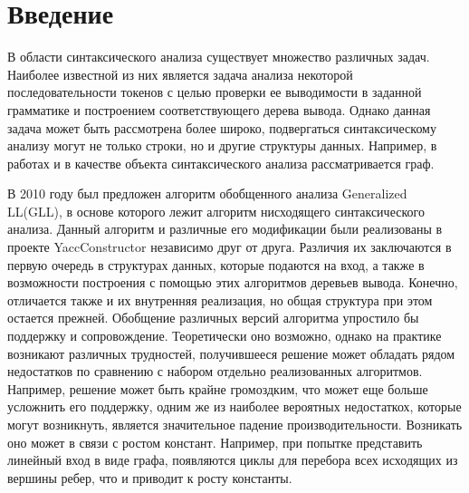 \documentclass[14pt]{matmex-diploma}
\begin{document}
\maketitle
\tableofcontents

\section*{Введение}
В области синтаксического анализа существует множество различных задач. Наиболее известной из них является задача анализа некоторой последовательности токенов с целью проверки ее выводимости в заданной грамматике и построением соответствующего дерева вывода. Однако данная задача может быть рассмотрена более широко, подвергаться синтаксическому анализу могут не только строки, но и другие структуры данных. Например, в работах \cite{graphParseVerb} и \cite{graphParseRag} в качестве объекта синтаксического анализа рассматривается граф.

В 2010 году был предложен алгоритм обобщенного анализа Generalized LL(GLL), в основе которого лежит алгоритм нисходящего синтаксического анализа\cite{GLLParsing}. Данный алгоритм и различные его модификации были реализованы в проекте YaccConstructor\cite{YaccConstructor} независимо друг от друга. Различия их заключаются в первую очередь в структурах данных, которые подаются на вход, а также в возможности построения с помощью этих алгоритмов деревьев вывода. Конечно, отличается также и их внутренняя реализация, но общая структура при этом остается прежней. Обобщение различных версий алгоритма упростило бы поддержку и сопровождение. Теоретически оно возможно, однако на практике возникают различных трудностей, получившееся решение может обладать рядом недостатков по сравнению с набором отдельно реализованных алгоритмов. Например, решение может быть крайне громоздким, что может еще больше усложнить его поддержку, одним же из наиболее вероятных недостаткох, которые могут возникнуть, является значительное падение производительности. Возникать оно может в связи с ростом констант. Например, при попытке представить линейный вход в виде графа, появляются циклы для перебора всех исходящих из вершины ребер, что и приводит к росту константы.
\end{document}
